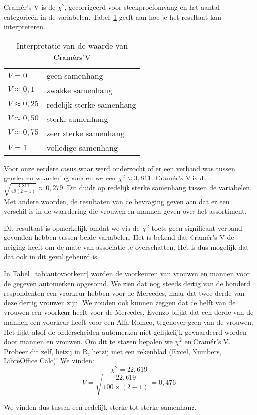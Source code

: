 Cramér's V is de $\chi^{2}$, gecorrigeerd voor steekproefomvang en het aantal categorieën in de variabelen. Tabel~\ref{tab:interpretatie-cramers-v} geeft aan hoe je het resultaat kan interpreteren.

\begin{table}
  \centering
  \begin{tabular}{ll}
    $V = 0$ & geen samenhang \\
    $V \approx 0,1$ & zwakke samenhang \\
    $V \approx 0,25$ & redelijk sterke samenhang \\
    $V \approx 0,50$ & sterke samenhang \\
    $V \approx 0,75$ & zeer sterke samenhang \\
    $V = 1$ & volledige samenhang \\
  \end{tabular}
  \caption{Interpretatie van de waarde van Cramérs'V}
  \label{tab:interpretatie-cramers-v}
\end{table}

Voor onze eerdere casus waar werd onderzocht of er een verband was tussen gender en waardering vonden we een $\chi^{2} \approx 3,811$. Cramér's V is dan $\sqrt{\frac{3,811}{49 (2 - 1)}} \approx 0,279$. Dit duidt op redelijk sterke samenhang tussen de variabelen. Met andere woorden, de resultaten van de bevraging geven aan dat er een verschil is in de waardering die vrouwen en mannen geven over het assortiment.

Dit resultaat is opmerkelijk omdat we via de $\chi^2$-toets geen significant verband gevonden hebben tussen beide variabelen. Het is bekend dat Cramér's V de neiging heeft om de mate van associatie te overschatten. Het is dus mogelijk dat dat ook in dit geval gebeurd is.

\begin{example}
  In Tabel~\ref{tab:autovoorkeur} worden de voorkeuren van vrouwen en mannen voor de gegeven automerken opgesomd. We zien dat nog steeds dertig van de honderd respondenten een voorkeur hebben voor de Mercedes, maar dat twee derde van deze dertig vrouwen zijn. We zouden  ook kunnen zeggen dat de helft van de vrouwen een voorkeur heeft voor de Mercedes. Evenzo blijkt dat een derde van de mannen een voorkeur heeft voor een Alfa Romeo, tegenover geen van de vrouwen. Het lijkt alsof de onderscheiden automerken niet gelijkelijk gewaardeerd worden door mannen en vrouwen. Om dit te staven bepalen we $\chi^{2}$ en Cramér's V. Probeer dit zelf, hetzij in R, hetzij met een rekenblad (Excel, Numbers, LibreOffice Calc)! We vinden:
  \[ \chi^{2} = 22,619 \]
  \[ V = \sqrt{\frac{22,619}{100 \times (2-1)}}  = 0,476\]
  
  We vinden dus tussen een redelijk sterke tot sterke samenhang.
\end{example}

